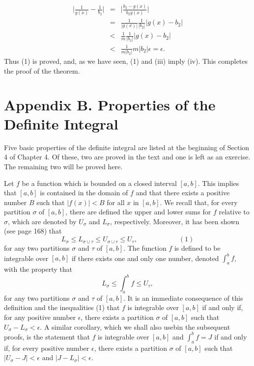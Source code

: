 \begin{eqnarray*}
\Big|\frac{1}{g(x)} - \frac{1}{b_2}\Big| 
&=& \Big|\frac{b_2 - g(x)}{b_2 g(x)} \Big| \\
&=& \frac{1}{|g(x)|} \frac{1}{|b_2|} |g(x) - b_2| \\
&<& \frac{1}{m} \frac{1}{|b_2|} |g(x) - b_2| \\
&<& \frac{1}{m |b_2|} m |b_2| \epsilon = \epsilon.
\end{eqnarray*}
Thus (1) is proved, and, as we have seen, (1) and (iii) imply (iv). This completes the proof of the theorem.


\chapter*{Appendix B.  Properties of the Definite Integral}

Five basic properties of the definite integral are listed at the beginning of Section 4 of Chapter 4. Of these, two are proved in the text and one is left as an exercise. The remaining two will be proved here.

Let $f$ be a function which is bounded on a closed interval $[a, b]$. This implies that $[a, b]$ is contained in the domain of $f$ and that there exists a positive number $B$ such that $|f(x)| < B$ for all $x$ in $[a, b]$. We recall that, for every partition $\sigma$ of $[a, b]$, there are defined the upper and lower sums for $f$ relative to $\sigma$, which are denoted by $U_\sigma$ and $L_\sigma$, respectively. Moreover, it has been shown (see page 168) that
$$
L_\sigma \leq L_{\sigma \cup \tau} \leq U_{\sigma \cup \tau} \leq U_\tau,  \hspace{1in}( 1 )
$$
for any two partitions $\sigma$ and $\tau$ of $[a, b]$. The function $f$ is defined to be integrable over $[a, b]$ if there exists one and only one number, denoted $\int_a^b f$, with the property that  
$$
L_\sigma \leq \int_a^b f \leq U_\tau , 
$$
for any two partitions $\sigma$ and $\tau$ of $[a, b]$. It is an immediate consequence of this definition and the inequalities (1) that $f$ is integrable over $[a, b]$ if and only if, for any positive number $\epsilon$, there exists a partition $\sigma$ of $[a, b]$ such that $U_\sigma - L_\sigma < \epsilon$. A similar corollary, which we shall also usebin the subsequent proofs, is the statement that $f$ is integrable over $[a, b]$ and $\int_a^b f = J$ if and only if, for every positive number $\epsilon$, there exists a partition $\sigma$ of $[a, b]$ such that $|U_\sigma - J| < \epsilon$ and $|J - L_\sigma| < \epsilon$.


